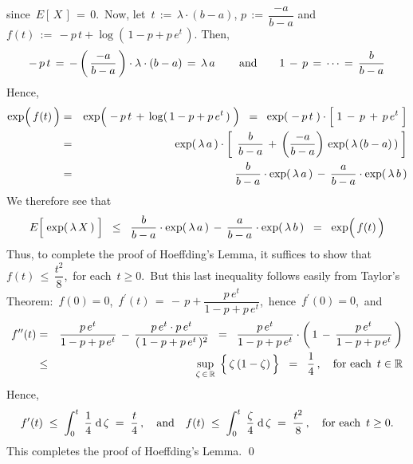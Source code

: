 since \,$E\!\left[\,X\,\right] \,=\, 0$.\,
Now, let \,$t \,:=\, \lambda\cdot(b-a)$, \;$p \,:=\, \dfrac{-a}{b-a}$\;
and \,$f(t) \,:=\, -p\,t + \log\!\left(\,1-p+p\,e^{t}\,\right)$.
Then,
\begin{equation*}
-\,p\,t \,=\, -\left(\,\dfrac{-a}{b-a}\,\right)\cdot\lambda\cdot(b-a) \,=\, \lambda\,a\,
\quad\quad\textnormal{and}\quad\quad
1 \, - \, p \,=\, \cdots \,=\, \dfrac{b}{b-a} 
\end{equation*}
Hence,
\begin{eqnarray*}
\exp\!\left(\,\overset{{\color{white}.}}{f}(t)\,\right)
&=&
	\exp\!\left(\;
		-\,p\,t \,\overset{{\color{white}.}}{+}\, \log(\,1-p+p\,e^{t}\,)
		\;\right)
\;\; = \;\;
	\exp\!\left(\;-\,p\,t \;\right) \cdot \left[\; 1 \,-\, p \,\overset{{\color{white}.}}{+}\, p\,e^{t} \;\right]
\\
&=&
	\exp\!\left(\, \lambda\,a \,\right)
	\cdot
	\left[\;\,
		\dfrac{b}{b-a}
		\,\overset{{\color{white}.}}{+}\,
		\left(\dfrac{-a}{b-a}\right)\,\exp(\,\lambda\,(b-a)\,)
		\;\right]
\\
&=&
	\dfrac{b}{b-a} \cdot \exp\!\left(\,\lambda\,a\,\right)
	\, - \,
	\dfrac{a}{b-a} \cdot \exp\!\left(\,\lambda\,b\,\right)
\end{eqnarray*}
We therefore see that
\begin{equation*}
E\!\left[\;\overset{{\color{white}-}}{\exp}\!\left(\,\lambda\,X\,\right)\;\right]
\;\; \leq \;\;
	\dfrac{b}{b-a} \cdot \exp\!\left(\,\lambda\,a\,\right)
	\, - \,
	\dfrac{a}{b-a} \cdot \exp\!\left(\,\lambda\,b\,\right)
\;\; = \;\;
	\exp\!\left(\,\overset{{\color{white}.}}{f}(t)\,\right)
\end{equation*}
Thus, to complete the proof of Hoeffding's Lemma, it suffices to show that
\,$f(t) \,\leq\, \dfrac{t^{2}}{8}$,\, for each \,$t \geq 0$.\,
But this last inequality follows easily from Taylor's Theorem:
\,$f(0) = 0$,\, $f^{\prime}(t)\,=\,-\,p+\dfrac{p\,e^{t}}{1-p+p\,e^{t}}$,\,
hence \,$f^{\prime}(0) = 0$,\, and
\begin{eqnarray*}
f^{\prime\prime}(t)
& = &
	\dfrac{p\,e^{t}}{1 - p + p\,e^{t}}
	\,-\,
	\dfrac{p\,e^{t} \cdot p\,e^{t}}{(\,1 - p + p\,e^{t}\,)^{2}}
\;\; = \;\;
	\dfrac{p\,e^{t}}{1 - p + p\,e^{t}}
	\cdot
	\left(\,1 \,-\, \dfrac{p\,e^{t}}{1 - p + p\,e^{t}}\,\right)
\\
& \leq &
	\underset{\zeta\,\in\,\Re}{\sup}\;\left\{\,\zeta\,(1\overset{{\color{white}.}}{-}\zeta)\,\right\}
\;\; = \;\;
	\dfrac{1}{4}\,,
	\quad\textnormal{for each \,$t \in \Re$}
\end{eqnarray*}
Hence,
\begin{equation*}
f^{\prime}(t)
\;\leq\;
	\int^{t}_{0}\;\dfrac{1}{4}\;\textnormal{d}\,\zeta
\; = \;
	\dfrac{t}{4}\,,
\quad\textnormal{and}\quad
f(t)
\;\leq\;
	\int^{t}_{0}\;\dfrac{\zeta}{4}\;\textnormal{d}\,\zeta
\; = \;
	\dfrac{t^{2}}{8}\,,
\quad\textnormal{for each \,$t \geq 0$}.
\end{equation*}
This completes the proof of Hoeffding's Lemma.
\qed

